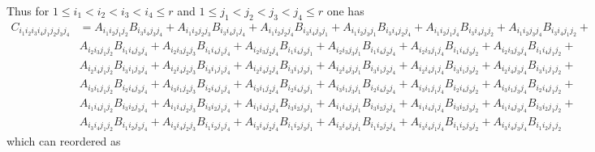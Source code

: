 \documentclass[aps,preprint]{revtex4}%
\begin{document}
Thus for $1\leq i_{1}<i_{2}<i_{3}<i_{4}\leq r$ and $1\leq j_{1}<j_{2}%
<j_{3}<j_{4}\leq r$ one has
\begin{align}
C_{i_{1}i_{2}i_{3}i_{4}j_{1}j_{2}j_{3}j_{4}}  & =A_{i_{1}i_{2}j_{1}j_{2}%
}B_{i_{3}i_{4}j_{3}j_{4}}+A_{i_{1}i_{2}j_{2}j_{3}}B_{i_{3}i_{4}j_{1}j_{4}%
}+A_{i_{1}i_{2}j_{2}j_{4}}B_{i_{3}i_{4}j_{3}j_{1}}+A_{i_{1}i_{2}j_{3}j_{1}%
}B_{i_{3}i_{4}j_{2}j_{4}}+A_{i_{1}i_{2}j_{1}j_{4}}B_{i_{3}i_{4}j_{3}j_{2}%
}+A_{i_{1}i_{2}j_{3}j_{4}}B_{i_{3}i_{4}j_{1}j_{2}}+\nonumber\\
& A_{i_{2}i_{3}j_{1}j_{2}}B_{i_{1}i_{4}j_{3}j_{4}}+A_{i_{2}i_{3}j_{2}j_{3}%
}B_{i_{1}i_{4}j_{1}j_{4}}+A_{i_{2}i_{3}j_{2}j_{4}}B_{i_{1}i_{4}j_{3}j_{1}%
}+A_{i_{2}i_{3}j_{3}j_{1}}B_{i_{1}i_{4}j_{2}j_{4}}+A_{i_{2}i_{3}j_{1}j_{4}%
}B_{i_{1}i_{4}j_{3}j_{2}}+A_{i_{2}i_{3}j_{3}j_{4}}B_{i_{1}i_{4}j_{1}j_{2}%
}+\nonumber\\
& A_{i_{2}i_{4}j_{1}j_{2}}B_{i_{3}i_{1}j_{3}j_{4}}+A_{i_{2}i_{4}j_{2}j_{3}%
}B_{i_{3}i_{1}j_{1}j_{4}}+A_{i_{2}i_{4}j_{2}j_{4}}B_{i_{3}i_{1}j_{3}j_{1}%
}+A_{i_{2}i_{4}j_{3}j_{1}}B_{i_{3}i_{1}j_{2}j_{4}}+A_{i_{2}i_{4}j_{1}j_{4}%
}B_{i_{3}i_{1}j_{3}j_{2}}+A_{i_{2}i_{4}j_{3}j_{4}}B_{i_{3}i_{1}j_{1}j_{2}%
}+\nonumber\\
& A_{i_{3}i_{1}j_{1}j_{2}}B_{i_{2}i_{4}j_{3}j_{4}}+A_{i_{3}i_{1}j_{2}j_{3}%
}B_{i_{2}i_{4}j_{1}j_{4}}+A_{i_{3}i_{1}j_{2}j_{4}}B_{i_{2}i_{4}j_{3}j_{1}%
}+A_{i_{3}i_{1}j_{3}j_{1}}B_{i_{2}i_{4}j_{2}j_{4}}+A_{i_{3}i_{1}j_{1}j_{4}%
}B_{i_{2}i_{4}j_{3}j_{2}}+A_{i_{3}i_{1}j_{3}j_{4}}B_{i_{2}i_{4}j_{1}j_{2}%
}+\nonumber\\
& A_{i_{1}i_{4}j_{1}j_{2}}B_{i_{3}i_{2}j_{3}j_{4}}+A_{i_{1}i_{4}j_{2}j_{3}%
}B_{i_{3}i_{2}j_{1}j_{4}}+A_{i_{1}i_{4}j_{2}j_{4}}B_{i_{3}i_{2}j_{3}j_{1}%
}+A_{i_{1}i_{4}j_{3}j_{1}}B_{i_{3}i_{2}j_{2}j_{4}}+A_{i_{1}i_{4}j_{1}j_{4}%
}B_{i_{3}i_{2}j_{3}j_{2}}+A_{i_{1}i_{4}j_{3}j_{4}}B_{i_{3}i_{2}j_{1}j_{2}%
}+\nonumber\\
& A_{i_{3}i_{4}j_{1}j_{2}}B_{i_{1}i_{2}j_{3}j_{4}}+A_{i_{3}i_{4}j_{2}j_{3}%
}B_{i_{1}i_{2}j_{1}j_{4}}+A_{i_{3}i_{4}j_{2}j_{4}}B_{i_{1}i_{2}j_{3}j_{1}%
}+A_{i_{3}i_{4}j_{3}j_{1}}B_{i_{1}i_{2}j_{2}j_{4}}+A_{i_{3}i_{4}j_{1}j_{4}%
}B_{i_{1}i_{2}j_{3}j_{2}}+A_{i_{3}i_{4}j_{3}j_{4}}B_{i_{1}i_{2}j_{1}j_{2}}%
\end{align}
which can reordered as
\end{document}
